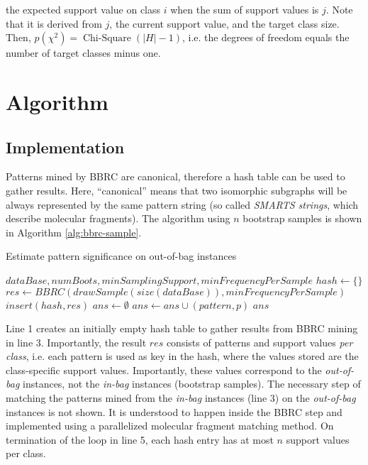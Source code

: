 \documentclass{article}
\begin{document}
the expected support value on class $i$ when the sum of support values is $j$. Note that it is derived from $j$, the current support value, and the target class size. Then, $p(\chi^2)=\operatorname{Chi-Square}\left(\vert H\vert-1\right)$, i.e. the degrees of freedom equals the number of target classes minus one.

\section{Algorithm}

\subsection{Implementation}
Patterns mined by BBRC are canonical, therefore a hash table can be used to gather results. Here, ``canonical'' means that two isomorphic subgraphs will be always represented by the same pattern string (so called \emph{SMARTS strings}, which describe molecular fragments). The algorithm using $n$ bootstrap samples is shown in Algorithm \ref{alg:bbrc-sample}.
\renewcommand{\algorithmicrequire}{\textbf{Input:}}
\renewcommand{\algorithmicensure}{\textbf{Output:}}
\begin{algorithm}
  \caption{Estimate pattern significance on out-of-bag instances}
  \label{alg:bbrc-sample}
\begin{algorithmic}[1]
  \Require $dataBase, numBoots, minSamplingSupport, minFrequencyPerSample$
  \State $hash \gets \{\}$
   
    \State $res \gets BBRC(drawSample(size(dataBase)), minFrequencyPerSample)$
    \State $insert(hash,res)$
  \EndFor
  \State $ans \gets \emptyset$
     
        \State $ans\gets ans \cup (pattern,p)$
      \EndIf
    \EndIf
  \EndFor
  \Ensure $ans$
\end{algorithmic}
\end{algorithm}

Line 1 creates an initially empty hash table to gather results from BBRC mining in line 3. Importantly, the result $res$ consists of patterns and support values \emph{per class}, i.e. each pattern is used as key in the hash, where the values stored are the class-specific support values. Importantly, these values correspond to the \emph{out-of-bag} instances, not the \emph{in-bag} instances (bootstrap samples). The necessary step of matching the patterns mined from the \emph{in-bag} instances (line 3) on the \emph{out-of-bag} instances is not shown. It is understood to happen inside the BBRC step and implemented using a parallelized molecular fragment matching method. On termination of the loop in line 5, each hash entry has at most $n$ support values per class.
\end{document}
